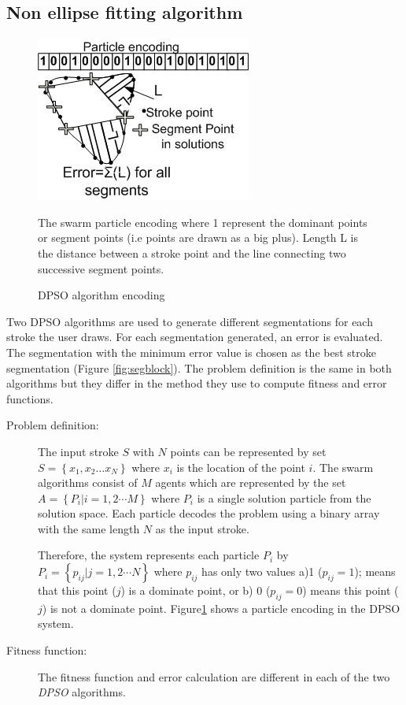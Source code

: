 \documentclass[preprint,10pt,5p,twocolumn]{elsarticle}
\begin{document}
\subsection{Non ellipse fitting algorithm}
\label{subsubsec:Discreteparticleswarmalgorithm}
\begin{figure}
	\centering
 	 \includegraphics[scale=0.7]{images/pso1.jpg}			
	\caption{DPSO algorithm encoding} The swarm particle encoding where 1 represent the dominant points or segment points (i.e points are drawn as a big plus). Length L is the distance between a stroke point and the line connecting two successive segment points.  
	\label{fig:pso1}
\end{figure}
Two DPSO algorithms are used to generate different segmentations for each stroke the user draws. For each segmentation generated, an error is evaluated. The segmentation with the minimum error value is chosen as the best stroke segmentation (Figure \ref{fig:segblock}). The problem definition is the same in both algorithms but they differ in the method they use to compute fitness and error functions. 
\begin{description}
	\item[ Problem definition:] The input stroke $S$  with $N$ points can be represented by set $S = \left\{ {x_1 ,x_2  \ldots x_N }\right\}$ where $x_i$ is the location of the point $i$. The swarm algorithms consist of $M$ agents which are represented by the set $A = \left\{ {P_i \left| {i = 1,2 \cdots M} \right.} \right\}$ where $P_i$ is a single solution particle from the solution space. Each particle decodes the problem using a binary array with the same length $N$ as the input stroke.  

Therefore, the system represents each particle $P_i$ by $P_i = \left\{ {p_{ij} \left| {j = 1,2 \cdots N} \right.} \right\}$ where $p_{ij}$ has only two values a)1 ($p_{ij}=1$); means that this point ($j$) is a dominate point, or b) 0 ($p_{ij}=0$) means this point ($j$) is not a dominate point. Figure\ref{fig:pso1} shows a particle encoding in the DPSO system. 

	\item[Fitness function:] The fitness function and error calculation are different in each of the two \textit{DPSO} algorithms. 
	\end{description}
\end{document}
